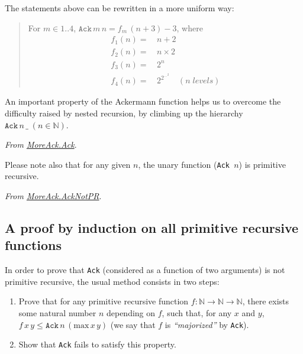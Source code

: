 \begin{remark}
 The statements above can be rewritten in a more uniform way:

 \begin{quote}
   For $m\in 1..4$, $\texttt{Ack}\,m\,n = f_m\,(n+3)-3$, where 
   \begin{align*}
   f_1(n)=&\,n+2 \\
   f_2(n)=&\,n\times 2\\
   f_3(n)=&\,2^n\\
   f_4(n)=&\,2^{2^{\dots^2}}\quad(n\;\textit{levels})
   \end{align*}
 \end{quote}
\end{remark}


An important property of the Ackermann function helps us 
to overcome the difficulty raised by nested recursion, by climbing up the hierarchy $\texttt{Ack}\,n\,\_\;(n\in\mathbb{N})$.


\noindent
\emph{From \href{../theories/html/hydras.MoreAck.Ack.html}{MoreAck.Ack}}.





Please note also that for any given $n$, the unary function
(\texttt{Ack\,$n$}) is primitive recursive.

\vspace{4pt}

\noindent

\emph{From \href{../theories/html/hydras.MoreAck.AckNotPR.html}{MoreAck.AckNotPR}}.







\subsection{A proof by induction on all primitive recursive functions}

In order to prove that \texttt{Ack} (considered as a function of two arguments) is not primitive recursive, the usual method consists in two steps:


\begin{enumerate}
\item Prove that for any primitive recursive function $f:\mathbb{N}\rightarrow\mathbb{N}\rightarrow\mathbb{N}$, there exists some natural number $n$ depending on $f$, such that, for any $x$ and $y$, 
$f\,x\,y \leq \texttt{Ack}\,n\,(\textrm{max}\,x\,y)$ (we say that $f$ is \emph{``majorized''}  by \texttt{Ack}).
\item Show that \texttt{Ack} fails to satisfy this property.
\end{enumerate}

